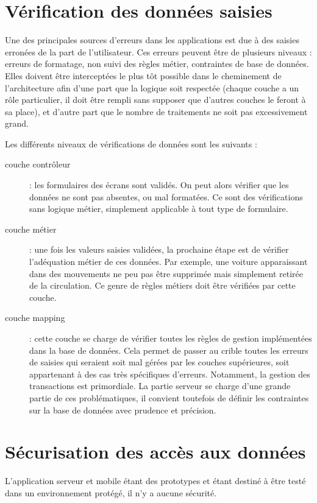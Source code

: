 \documentclass[a4paper,12pt]{report}
\begin{document}
\begin{onehalfspace}
\section{Vérification des données saisies}
  Une des principales sources d’erreurs dans les applications est due à des saisies erronées de la part de l’utilisateur. Ces erreurs peuvent être de plusieurs niveaux : erreurs de formatage, non suivi des règles métier, contraintes de base de données. Elles doivent être interceptées le plus tôt possible dans le cheminement de l’architecture afin d’une part que la logique soit respectée (chaque couche a un rôle particulier, il doit être  rempli sans supposer que d’autres couches le feront à sa place), et d’autre part que le nombre de traitements ne soit pas excessivement grand.

Les différents niveaux de vérifications de données sont les suivants :
\begin{description}
\item[couche contrôleur] : les formulaires des écrans sont validés. On peut alors vérifier que les données ne sont pas absentes, ou mal formatées. Ce sont des vérifications sans logique métier, simplement applicable à tout type de formulaire.
\item[couche métier] : une fois les valeurs saisies validées, la prochaine étape est de vérifier l’adéquation métier de ces données. Par exemple, une voiture apparaissant dans des mouvements ne peu pas être supprimée mais simplement retirée de la circulation. Ce genre de règles métiers doit être vérifiées par cette couche.
\item[couche mapping] : cette couche se charge de vérifier toutes les règles de gestion implémentées dans la base de données. Cela permet de passer au crible toutes les erreurs de saisies qui seraient soit mal gérées par les couches supérieures, soit appartenant à des cas très spécifiques d’erreurs. Notamment, la gestion des transactions est primordiale. La partie serveur se charge d’une grande partie de ces problématiques, il convient toutefois de définir les contraintes sur la base de données avec prudence et précision.
\end{description}

\section{Sécurisation des accès aux données}
  L'application serveur et mobile étant des prototypes et étant destiné à être testé dans un environnement protégé, il n'y a aucune sécurité.


\end{onehalfspace}
\end{document}
